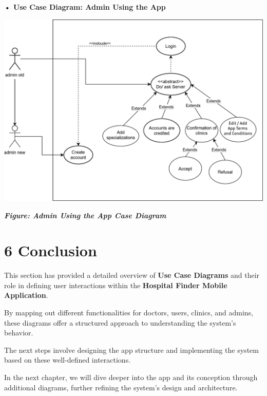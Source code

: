 \documentclass[12pt]{report}
\begin{document}
\vspace{0.5cm}
\noindent \textbf{• Use Case Diagram: Admin Using the App}
\vspace{0.6cm}
\begin{center}
	\includegraphics[width=\textwidth]{images/adminCAS.pdf} %
\end{center}
\vspace{-0.35cm}
\begin{center}
	\textit{\textbf{Figure: Admin Using the App Case Diagram}}
\end{center}

\newpage
\section*{\textbf{6 Conclusion}}

\noindent This section has provided a detailed overview of \textbf{Use Case Diagrams} and their role in defining user interactions within the \textbf{Hospital Finder Mobile Application}.\vspace{0.5cm}

\noindent By mapping out different functionalities for doctors, users, clinics, and admins, these diagrams offer a structured approach to understanding the system's behavior.\vspace{0.5cm}

\noindent The next steps involve designing the app structure and implementing the system based on these well-defined interactions.\vspace{0.5cm}

\noindent In the next chapter, we will dive deeper into the app and its conception through additional diagrams, further refining the system's design and architecture.
\end{document}
